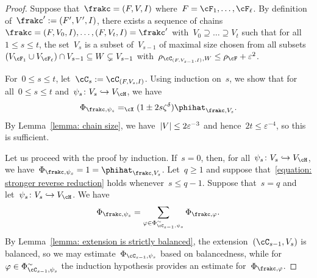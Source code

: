 \documentclass[11pt]{amsart}
\newcommand{\eps}{\varepsilon}
\DeclarePairedDelimiter{\abs}{\lvert}{\rvert}
\newcommand{\Xeq}{=_{\cX}}
\def\phi{\varphi}
\newcommand{\injection}{\hookrightarrow}
\theoremstyle{definition}
\numberwithin{equation}{section}
\begin{document}
	\begin{proof}
		Suppose that~$\frakc=(F,V,I)$ where~$F=\cF_1,\ldots,\cF_\ell$.
		By definition of~$\frakc':=(F',V',I)$, there exists a sequence of chains~$\frakc=(F,V_0,I),\ldots,(F,V_t,I)=\frakc'$ with~$V_0\supseteq\ldots\supseteq V_t$ such that for all~$1\leq s\leq t$, the set~$V_s$ is a subset of~$V_{s-1}$ of maximal size chosen from all subsets~$(V_{\cF_1}\cup V_{\cF_\ell})\cap V_{s-1}\subseteq W\subsetneq V_{s-1}$ with~$\rho_{\cC_{(F,V_{s-1},I)},W}\leq \rho_\cF+\eps^2$.
		
		For~$0\leq s\leq t$, let~$\cC_s:=\cC_{(F,V_{s},I)}$.
		Using induction on~$s$, we show that for all~$0\leq s\leq t$ and~$\psi_s\colon V_s\injection V_\cH$, we have
		\begin{equation}\label{equation: stronger reverse reduction}
			\Phi_{\frakc,\psi_s}\Xeq(1\pm 2s\zeta^\delta)\phihat_{\frakc,V_s}.
		\end{equation}
		By Lemma~\ref{lemma: chain size}, we have~$\abs{V}\leq 2\eps^{-3}$ and hence~$2t\leq \eps^{-4}$, so this is sufficient.
		
		Let us proceed with the proof by induction.
		If~$s=0$, then, for all~$\psi_s\colon V_s\injection V_\cH$, we have~$\Phi_{\frakc,\psi_s}=1=\phihat_{\frakc,V_s}$.
		Let~$q\geq 1$ and suppose that~\eqref{equation: stronger reverse reduction} holds whenever~$s\leq q-1$.
		Suppose that~$s=q$ and let~$\psi_s\colon V_s\injection V_\cH$.
		We have
		\begin{equation}\label{equation: reverse reduction split}
			\Phi_{\frakc,\psi_s}
			=\sum_{\phi\in\Phi^\sim_{\cC_{s-1},\psi_s}} \Phi_{\frakc,\phi}.
		\end{equation}
		By Lemma~\ref{lemma: extension is strictly balanced}, the extension~$(\cC_{s-1},V_{s})$ is balanced, so we may estimate~$\Phi_{\cC_{s-1},\psi_s}$ based on balancedness, while for~$\phi\in\Phi^\sim_{\cC_{s-1},\psi_s}$ the induction hypothesis provides an estimate for~$\Phi_{\frakc,\phi}$.
		

\end{proof}
\end{document}

